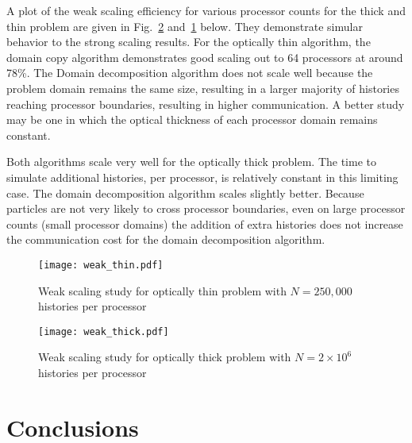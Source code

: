 \documentclass[12pt]{article}
\begin{document}
{{{A plot of the weak scaling efficiency for various processor counts for the thick and
thin problem are given in Fig.~\ref{weak2} and~\ref{weak1} below.  They demonstrate
simular behavior to the strong scaling results.  For the optically thin algorithm,
the domain copy algorithm demonstrates good scaling out to 64 processors at around
78\%.  The Domain decomposition algorithm does not scale well because the problem
domain remains the same size, resulting in a larger majority of histories reaching
processor boundaries, resulting in higher communication. A better study may be one in
which the optical thickness of each processor domain remains constant.

Both algorithms scale very well for the optically thick problem. The time to simulate
additional histories, per processor, is relatively constant in this limiting case. The domain
decomposition algorithm scales slightly better. Because particles are not very likely
to cross processor boundaries, even on large processor counts (small processor
domains) the addition of extra histories does not increase the
communication cost for the domain decomposition algorithm.  

     \begin{figure}[htbp!]
         \centering
           \texttt{[image: weak\_thin.pdf]}
           \caption{Weak scaling study for optically thin problem with $N=250,000$ histories per processor
           \label{weak1}}
     \end{figure}
     \begin{figure}[ht!]
         \centering
           \texttt{[image: weak\_thick.pdf]}
           \caption{Weak scaling study for optically thick problem with
               $N=2\times 10^6$ histories per processor
           \label{weak2}}
     \end{figure}

\section{Conclusions}

}}}
\end{document}
